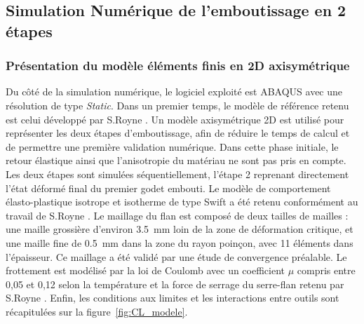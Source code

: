 \documentclass[14pt]{extarticle}
\begin{document}
\subsection{Simulation Numérique de l'emboutissage en 2 étapes}

\subsubsection{Présentation du modèle éléments finis en 2D axisymétrique}


Du côté de la simulation numérique, le logiciel exploité est ABAQUS 
avec une résolution de type \textit{Static}. Dans un premier temps, le modèle de 
référence retenu est celui développé par S.Royne \cite{royne_etude_2025}. 
Un modèle axisymétrique 2D est utilisé pour représenter les deux 
étapes d'emboutissage, afin de réduire le temps de calcul et de 
permettre une première validation numérique. 
Dans cette phase initiale, le retour élastique ainsi que l'anisotropie 
du matériau ne sont pas pris en compte. Les deux étapes sont simulées 
séquentiellement, l'étape 2 reprenant directement l'état déformé final 
du premier godet embouti. Le modèle de comportement élasto-plastique 
isotrope et isotherme de type Swift a été retenu conformément au travail de S.Royne 
\cite{royne_etude_2025}. Le maillage du flan est composé de deux 
tailles de mailles : une maille grossière d'environ \SI{3.5}{mm} loin 
de la zone de déformation critique, et une maille fine de \SI{0.5}{mm} 
dans la zone du rayon poinçon, avec 11 éléments dans l'épaisseur. Ce 
maillage a été validé par une étude 
de convergence préalable. Le frottement est modélisé par la loi de 
Coulomb avec un coefficient $\mu$ compris entre 0,05 et 0,12 selon 
la température et la force de serrage du serre-flan retenu par S.Royne \cite{royne_etude_2025}. 
Enfin, les conditions aux limites et les interactions entre outils sont 
récapitulées sur la figure~\ref{fig:CL_modele}.
\end{document}
